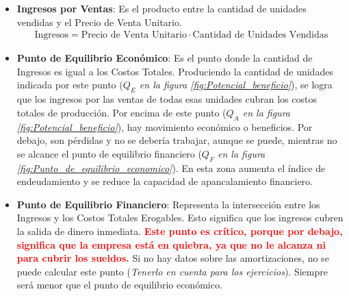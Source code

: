 \documentclass[12pt,a4paper]{article}
\begin{document}
\begin{itemize}
        \item	\textbf{Ingresos por Ventas}: Es el producto entre la cantidad de unidades vendidas y el Precio de Venta Unitario.
        		\begin{align}
                	\text{Ingresos} = \text{Precio de Venta Unitario} \cdot \text{Cantidad de Unidades Vendidas}
                    \label{Ingresos}
				\end{align}
        
		\item	\textbf{Punto de Equilibrio Económico}: Es el punto donde la cantidad de Ingresos es igual a los Costos Totales.
        		Produciendo la cantidad de unidades indicada por este punto (\textsl{$Q_E$ en la figura \ref{fig:Potencial_beneficio}}), se logra que los ingresos por las ventas de todas esas unidades cubran los costos totales de producción.
                Por encima de este punto (\textsl{$Q_A$ en la figura \ref{fig:Potencial_beneficio}}), hay movimiento económico o beneficios.
                Por debajo, son pérdidas y no se debería trabajar, aunque se puede, mientras no se alcance el punto de equilibrio financiero (\textsl{$Q_F$ en la figura \ref{fig:Punto_de_equilibrio_economico}}).
                En esta zona aumenta el índice de endeudamiento y se reduce la capacidad de apancalamiento financiero.
                
		\item	\textbf{Punto de Equilibrio Financiero}: Representa la intersección entre los Ingresos y los Costos Totales Erogables.
        		Esto significa que los ingresos cubren la salida de dinero inmediata.
                \textbf{\textcolor{red}{Este punto es crítico, porque por debajo, significa que la empresa está en quiebra, ya que no le alcanza ni para cubrir los sueldos.}}
                Si no hay datos sobre las amortizaciones, no se puede calcular este punto (\textsl{Tenerlo en cuenta para los ejercicios}).
                Siempre será menor que el punto de equilibrio económico.
                
	\end{itemize}
    
\end{document}
